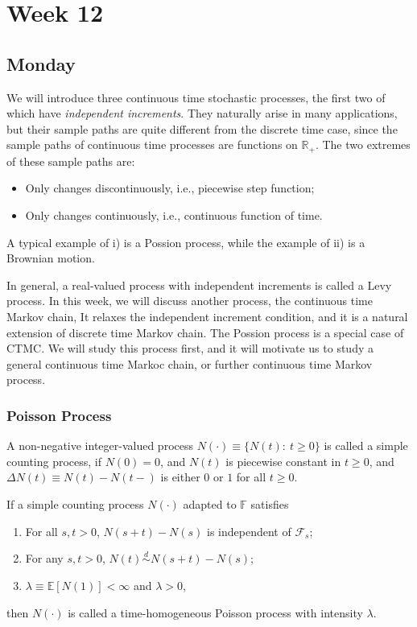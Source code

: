 
\chapter{Week 12}

\section{Monday}
We will introduce three continuous time stochastic processes, the first two of which have \emph{independent increments}.
They naturally arise in many applications, but their sample paths are quite different from the discrete time case, since the sample paths of continuous time processes are functions on $\mathbb{R}_+$.
The two extremes of these sample paths are:
\begin{itemize}
\item
Only changes discontinuously, i.e., piecewise step function;
\item
Only changes continuously, i.e., continuous function of time.
\end{itemize}
A typical example of i) is a Possion process, while the example of ii) is a Brownian motion.

In general, a real-valued process with independent increments is called a Levy process.
In this week, we will discuss another process, the continuous time Markov chain,
It relaxes the independent increment condition, and it is a natural extension of discrete time Markov chain.
The Possion process is a special case of CTMC. We will study this process first, and it will motivate us to study a general continuous time Markoc chain, or further continuous time Markov process.

\subsection{Poisson Process}
\begin{definition}
A non-negative integer-valued process $N(\cdot)\equiv\{N(t):~t\ge0\}$ is called a simple counting process,
if $N(0)=0$, and $N(t)$ is piecewise constant in $t\ge0$, and $\Delta N(t)\equiv N(t)-N(t-)$ is either $0$ or $1$ for all $t\ge0$.
\end{definition}

\begin{definition}
If a simple counting process $N(\cdot)$ adapted to $\mathbb{F}$ satisfies
\begin{enumerate}
\item
For all $s,t>0$, $N(s+t)-N(s)$ is independent of $\mathcal{F}_s$;
\item
For any $s,t>0$, $N(t)\overset{d}{\sim}N(s+t)-N(s)$;
\item
$\lambda\equiv \mathbb{E}[N(1)]<\infty$ and $\lambda>0$,
\end{enumerate}
then $N(\cdot)$ is called a time-homogeneous Poisson process with intensity $\lambda$.
\end{definition}

